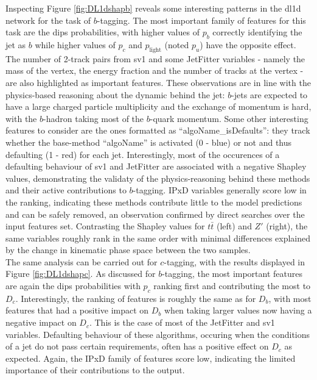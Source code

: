 Inspecting Figure \ref{fig:DL1dshapb} reveals some interesting patterns in the \gls{dl1d} network for the task of $b$-tagging. The most important family of features for this task are the \gls{dips} probabilities, with higher values of $p_b$ correctly identifying the jet as $b$ while higher values of $p_c$ and $p_{\textrm{light}}$ (noted $p_u$) have the opposite effect. The number of 2-track pairs from \gls{sv1} and some JetFitter variables - namely the mass of the vertex, the energy fraction and the number of tracks at the vertex - are also highlighted as important features. These observations are in line with the physics-based reasoning about the dynamic behind the jet: $b$-jets are expected to have a large charged particle multiplicity and the exchange of momentum is hard, with the $b$-hadron taking most of the $b$-quark momentum. Some other interesting features to consider are the ones formatted as  ``algoName\_isDefaults'': they track whether the base-method ``algoName'' is activated (0 - blue) or not and thus defaulting (1 - red) for each jet. Interestingly, most of the occurences of a defaulting behaviour of \gls{sv1} and JetFitter are associated with a negative Shapley values, demonstrating the validaty of the physics-reasoning behind these methods and their active contributions to $b$-tagging. IPxD variables generally score low in the ranking, indicating these methods contribute little to the model predictions and can be safely removed, an observation confirmed by direct searches over the input features set. Contrasting the Shapley values for $t\bar{t}$ (left) and $Z'$ (right), the same variables roughly rank in the same order with minimal differences explained by the change in kinematic phase space between the two samples. \\

The same analysis can be carried out for $c$-tagging, with the results displayed in Figure \ref{fig:DL1dshapc}. As discussed for $b$-tagging, the most important features are again the \gls{dips} probabilities with $p_c$ ranking first and contributing the most to $D_c$. Interestingly, the ranking of features is roughly the same as for $D_b$, with most features that had a positive impact on $D_b$ when taking larger values now having a negative impact on $D_c$. This is the case of most of the JetFitter and \gls{sv1} variables. Defaulting behaviour of these algorithms, occuring when the conditions of a jet do not pass certain requirements, often has a positive effect on $D_c$ as expected. Again, the IPxD family of features score low, indicating the limited importance of their contributions to the output. 

